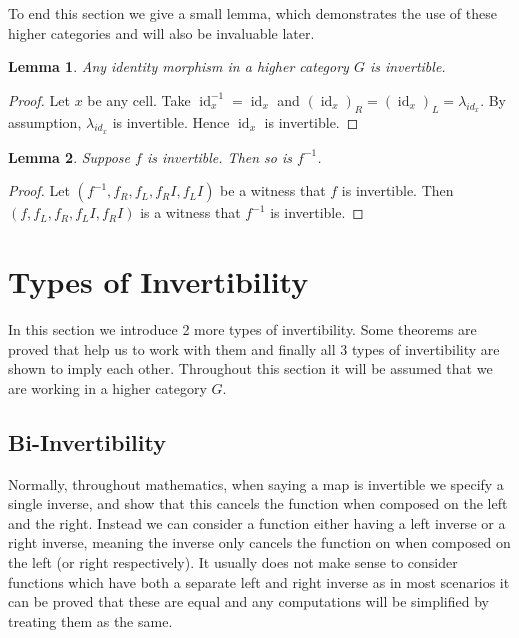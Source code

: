 \documentclass{article}
\newtheorem{lemma}{Lemma}
\theoremstyle{definition}
\theoremstyle{remark}
\DeclareMathOperator{\id}{id}
\newcommand{\inv}[1]{#1^{-1}}
\begin{document}
To end this section we give a small lemma, which demonstrates the use of these higher categories and will also be invaluable later.

\begin{lemma}\label{lem:identity}
  Any identity morphism in a higher category \(G\) is invertible.
\end{lemma}

\begin{proof}
  Let \(x\) be any cell. Take \(\inv {\id_x} = \id_x\) and \({(\id_x)}_R = {(\id_x)}_L = \lambda_{id_x}\). By assumption, \(\lambda_{id_x}\) is invertible. Hence \(\id_x\) is invertible.
\end{proof}

\begin{lemma}\label{lem:inverse-invert}
  Suppose \(f\) is invertible. Then so is \(\inv f\).
\end{lemma}

\begin{proof}
  Let \((\inv f, f_R, f_L, f_R{}I, f_L{}I)\) be a witness that \(f\) is invertible. Then \((f , f_L, f_R, f_L{}I, f_R{}I)\) is a witness that \(\inv f\) is invertible.
\end{proof}

\section{Types of Invertibility}\label{sec:invertibility}

In this section we introduce 2 more types of invertibility. Some theorems are proved that help us to work with them and finally all 3 types of invertibility are shown to imply each other. Throughout this section it will be assumed that we are working in a higher category \(G\).

\subsection{Bi-Invertibility}\label{sec:bi-invertibility}

Normally, throughout mathematics, when saying a map is invertible we specify a single inverse, and show that this cancels the function when composed on the left and the right. Instead we can consider a function either having a left inverse or a right inverse, meaning the inverse only cancels the function on when composed on the left (or right respectively). It usually does not make sense to consider functions which have both a separate left and right inverse as in most scenarios it can be proved that these are equal and any computations will be simplified by treating them as the same.
\end{document}
